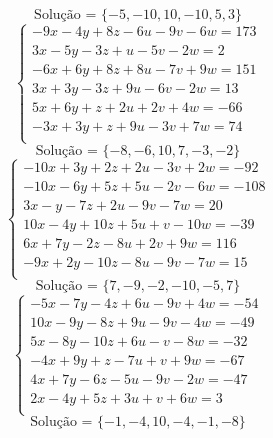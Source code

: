 \documentclass[12pt,oneside,a4paper]{article}
\begin{document}
\begin{equation*}
\text{Solução = }\{-5,-10,10,-10,5,3\}
\end{equation*}
\vspace{\baselineskip}
\begin{equation*}
\begin{cases}
-9x-4y+8z-6u-9v-6w=173 \\
3x-5y-3z+u-5v-2w=2 \\
-6x+6y+8z+8u-7v+9w=151 \\
3x+3y-3z+9u-6v-2w=13 \\
5x+6y+z+2u+2v+4w=-66 \\
-3x+3y+z+9u-3v+7w=74 \\
\end{cases}
\end{equation*}
\begin{equation*}
\text{Solução = }\{-8,-6,10,7,-3,-2\}
\end{equation*}
\vspace{\baselineskip}
\begin{equation*}
\begin{cases}
-10x+3y+2z+2u-3v+2w=-92 \\
-10x-6y+5z+5u-2v-6w=-108 \\
3x-y-7z+2u-9v-7w=20 \\
10x-4y+10z+5u+v-10w=-39 \\
6x+7y-2z-8u+2v+9w=116 \\
-9x+2y-10z-8u-9v-7w=15 \\
\end{cases}
\end{equation*}
\begin{equation*}
\text{Solução = }\{7,-9,-2,-10,-5,7\}
\end{equation*}
\vspace{\baselineskip}
\begin{equation*}
\begin{cases}
-5x-7y-4z+6u-9v+4w=-54 \\
10x-9y-8z+9u-9v-4w=-49 \\
5x-8y-10z+6u-v-8w=-32 \\
-4x+9y+z-7u+v+9w=-67 \\
4x+7y-6z-5u-9v-2w=-47 \\
2x-4y+5z+3u+v+6w=3 \\
\end{cases}
\end{equation*}
\begin{equation*}
\text{Solução = }\{-1,-4,10,-4,-1,-8\}
\end{equation*}
\end{document}
